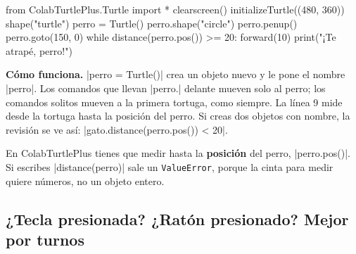 \begin{tcbraster}[raster columns=2, raster equal height=rows, raster column skip=12pt, raster valign=center, raster force size=false, raster column 1/.style={width=0.36\linewidth}, raster column 2/.style={width=0.64\linewidth-12pt}]
\begin{tcolorbox}[colback=white, colframe=white, boxrule=0pt, valign=center, left=0pt, right=0pt]
\begin{scratch}[scale=0.71]
\end{scratch}
\end{tcolorbox}
\begin{code}
from ColabTurtlePlus.Turtle import *
clearscreen()
initializeTurtle((480, 360))
shape("turtle")
perro = Turtle()
perro.shape("circle")
perro.penup()
perro.goto(150, 0)
while distance(perro.pos()) >= 20:
    forward(10)
print("¡Te atrapé, perro!")
\end{code}
\end{tcbraster}

\textbf{Cómo funciona.} \py|perro = Turtle()| crea un objeto nuevo y le pone el nombre \py|perro|. Los comandos que llevan \py|perro.| delante mueven solo al perro; los comandos solitos mueven a la primera tortuga, como siempre. La línea 9 mide desde la tortuga hasta la posición del perro. Si creas dos objetos con nombre, la revisión se ve así: \py|gato.distance(perro.pos()) < 20|.

\begin{watchout}
En ColabTurtlePlus tienes que medir hasta la \textbf{posición} del perro, \py|perro.pos()|. Si escribes \py|distance(perro)| sale un \texttt{ValueError}, porque la cinta para medir quiere números, no un objeto entero.
\end{watchout}

\subsection*{¿Tecla presionada? ¿Ratón presionado? Mejor por turnos}

